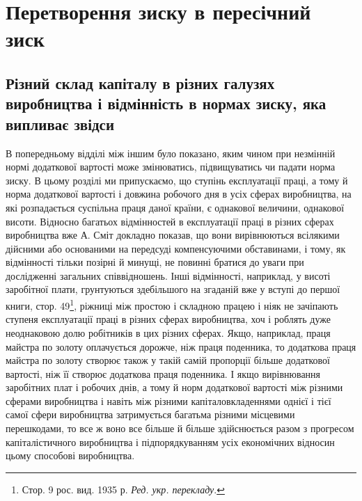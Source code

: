 \chapter{Перетворення зиску в пересічний зиск}

\section{Різний склад капіталу в різних галузях виробництва
і відмінність в нормах зиску, яка випливає звідси}

В попередньому відділі між іншим було показано, яким чином
при незмінній нормі додаткової вартості може змінюватись, підвищуватись
чи падати норма зиску. В цьому розділі ми припускаємо,
що ступінь експлуатації праці, а тому й норма додаткової
вартості і довжина робочого дня в усіх сферах виробництва,
на які розпадається суспільна праця даної країни, є однакової величини,
однакової висоти. Відносно багатьох відмінностей в експлуатації
праці в різних сферах виробництва вже А. Сміт докладно показав,
що вони вирівнюються всілякими дійсними або основаними на передсуді
компенсуючими обставинами, і тому, як відмінності тільки
позірні й минущі, не повинні братися до уваги при дослідженні загальних
співвідношень. Інші відмінності, наприклад, у висоті заробітної
плати, грунтуються здебільшого на згаданій вже у вступі до
першої книги, стор. 49\footnote*{Стор. 9 рос. вид. 1935 р. \emph{Ред. укр. перекладу}.}, ріжниці між простою і складною працею
і ніяк не зачіпають ступеня експлуатації праці в різних сферах
виробництва, хоч і роблять дуже неоднаковою долю робітників
в цих різних сферах. Якщо, наприклад, праця майстра по золоту
оплачується дорожче, ніж праця поденника, то додаткова праця
майстра по золоту створює також у такій самій пропорції більше
додаткової вартості, ніж її створює додаткова праця поденника.
І якщо вирівнювання заробітних плат і робочих днів, а тому й
норм додаткової вартості між різними сферами виробництва
і навіть між різними капіталовкладеннями однієї і тієї самої
сфери виробництва затримується багатьма різними місцевими
перешкодами, то все ж воно все більше й більше здійснюється
разом з прогресом капіталістичного виробництва і підпорядкуванням
усіх економічних відносин цьому способові виробництва.
\parbreak{}  %
